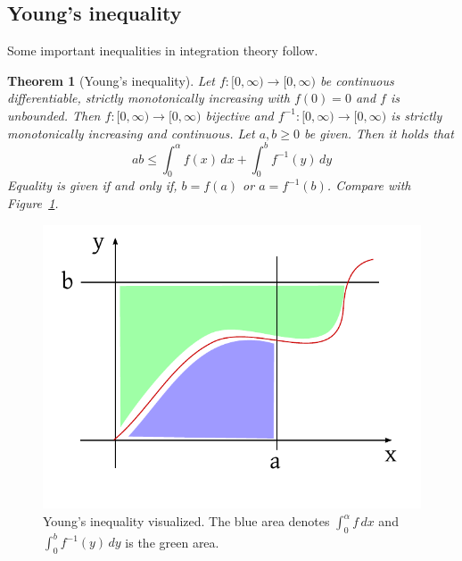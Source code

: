 \documentclass{article}
\newtheorem{theorem}{Theorem}  \numberwithin{theorem}{section}
\begin{document}
\subsection{Young's inequality}

Some important inequalities in integration theory follow.

\begin{theorem}[Young's inequality] %
  Let $f: [0, \infty) \to [0,\infty)$ be continuous differentiable, strictly monotonically increasing with $f(0) = 0$ and $f$ is unbounded.
  Then $f: [0, \infty) \to [0,\infty)$ bijective and $f^{-1}: [0,\infty) \to [0,\infty)$ is strictly monotonically increasing and continuous.
  Let $a, b \geq 0$ be given. Then it holds that
  \[ ab \leq \int_0^\alpha f(x) \, dx + \int_0^b f^{-1}(y) \, dy \]
  Equality is given if and only if, $b = f(a)$ or $a = f^{-1}(b)$.
  Compare with Figure~\ref{img:young}.
\end{theorem}

\begin{figure}[t]
  \begin{center}
    \includegraphics{img/23_young.pdf}
    \caption{Young's inequality visualized. The blue area denotes $\int_0^\alpha f \, dx$ and $\int_0^b f^{-1}(y) \, dy$ is the green area.}
    \label{img:young}
  \end{center}
\end{figure}
\end{document}
